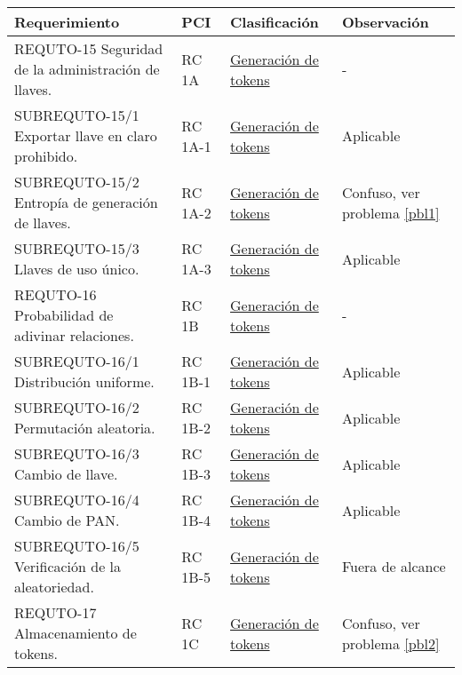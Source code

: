 \begin{table}[H]
  \centering
  \begin{tabular}{| p{5.5cm} | p{2cm} | p{4cm} | p{4cm} |}

    \hline
      \textbf{Requerimiento}    &
      \textbf{PCI}              &
      \textbf{Clasificación}    &
      \textbf{Observación}     \\ [0.8ex]
    \hline

    REQUTO-15 Seguridad de la administración de llaves.  
    &  RC 1A    &  \hyperref[dm:gen_tokens]{Generación de tokens}              &  -                \\ \hline
    SUBREQUTO-15/1 Exportar llave en claro prohibido.  
    &  RC 1A-1  &  \hyperref[dm:gen_tokens]{Generación de tokens}              &  Aplicable        \\ \hline
    SUBREQUTO-15/2 Entropía de generación de llaves.  
    &  RC 1A-2  &  \hyperref[dm:gen_tokens]{Generación de tokens}              &  Confuso, ver problema \ref{pbl1}  \\ \hline
    SUBREQUTO-15/3 Llaves de uso único.  
    &  RC 1A-3  &  \hyperref[dm:gen_tokens]{Generación de tokens}              &  Aplicable        \\ \hline
    REQUTO-16 Probabilidad de adivinar relaciones.  
    &  RC 1B    &  \hyperref[dm:gen_tokens]{Generación de tokens}              &  -                \\ \hline
    SUBREQUTO-16/1 Distribución uniforme.  
    &  RC 1B-1  &  \hyperref[dm:gen_tokens]{Generación de tokens}              &  Aplicable        \\ \hline
    SUBREQUTO-16/2 Permutación aleatoria.  
    &  RC 1B-2  &  \hyperref[dm:gen_tokens]{Generación de tokens}              &  Aplicable        \\ \hline
    SUBREQUTO-16/3 Cambio de llave.  
    &  RC 1B-3  &  \hyperref[dm:gen_tokens]{Generación de tokens}              &  Aplicable        \\ \hline
    SUBREQUTO-16/4 Cambio de PAN.  
    &  RC 1B-4  &  \hyperref[dm:gen_tokens]{Generación de tokens}              &  Aplicable        \\ \hline
    SUBREQUTO-16/5 Verificación de la aleatoriedad.  
    &  RC 1B-5  &  \hyperref[dm:gen_tokens]{Generación de tokens}              &  Fuera de alcance \\ \hline
    REQUTO-17 Almacenamiento de tokens.  
    &  RC 1C    &  \hyperref[dm:gen_tokens]{Generación de tokens}              &  Confuso, ver problema \ref{pbl2}  \\ \hline

\end{tabular}
\end{table}
